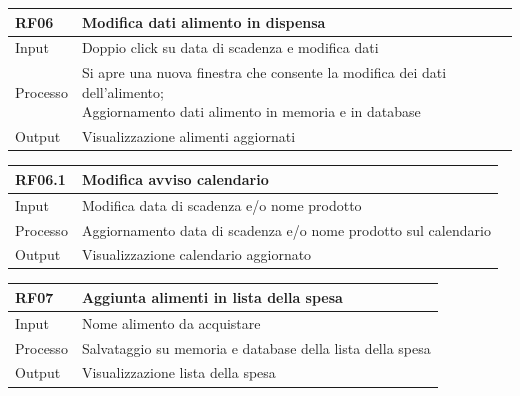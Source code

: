 \documentclass{article}
\begin{document}
\begin{table}[H]
    \begin{flushleft}
      \begin{tabular}{l|l}
        \toprule
        \textbf{RF06} & \textbf{Modifica dati alimento in dispensa}\\
        \midrule
        Input & Doppio click su data di scadenza e modifica dati\\
        Processo & \makecell{Si apre una nuova finestra che consente la modifica dei dati dell’alimento; \\ Aggiornamento dati alimento in memoria e in database}\\
        Output & Visualizzazione alimenti aggiornati\\
        \bottomrule
      \end{tabular}
    \end{flushleft}
\end{table}

\begin{table}[H]
    \begin{flushleft}
      \begin{tabular}{l|l}
        \toprule
        \textbf{RF06.1} & \textbf{Modifica avviso calendario}\\
        \midrule
        Input & Modifica data di scadenza e/o nome prodotto\\
        Processo & Aggiornamento data di scadenza e/o nome prodotto sul calendario\\
        Output & Visualizzazione calendario aggiornato\\
        \bottomrule
      \end{tabular}
    \end{flushleft}
\end{table}

\begin{table}[H]
    \begin{flushleft}
      \begin{tabular}{l|l}
        \toprule
        \textbf{RF07} & \textbf{Aggiunta alimenti in lista della spesa}\\
        \midrule
        Input & Nome alimento da acquistare\\
        Processo & Salvataggio su memoria e database della lista della spesa\\
        Output & Visualizzazione lista della spesa\\
        \bottomrule
      \end{tabular}
    \end{flushleft}
\end{table}
\end{document}

